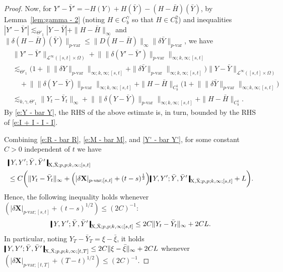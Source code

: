 \documentclass[11pt,reqno]{amsart}
\numberwithin{equation}{section}
\newcommand{\shortthickbar}{%
  \vcenter{\hbox{\rule{1.8pt}{2.2ex}}}%
}
\newcommand{\thicknm}[1]{%
  \mathopen{\shortthickbar}%
  \mkern4mu #1 \mkern4mu%
  \mathclose{\shortthickbar}%
}
\begin{document}
\begin{proof}
Now, for $Y' - \bar Y' = - H(Y) + H(\bar Y) - (H - \bar H)(\bar Y)$, by Lemma~\ref{lem:gamma - 2} (noting $H \in C^{\gamma}_b$ so that $H \in C^{2}_b$) and inequalities $|Y' - \bar Y'|\lesssim_{\Theta'_1} |Y - \bar Y| + \|H - \bar H\|_{\infty}$ and $\|\delta (H - \bar H)(\bar Y)\|_{p\text{-}\mathrm{var}} \le \|D(H - \bar H)\|_{\infty} \|\delta \bar Y\|_{p\text{-}\mathrm{var}}$, we have 
\begin{equation}\label{Y' - bar Y'}
\begin{aligned}
&\|Y' - \bar Y'\|_{\mathcal L^{\infty}([s,t] \times \Omega)} + \big\| \|\delta (Y' - \bar Y' )\|_{p\text{-}\mathrm{var}} \big\|_{\infty;k,\infty;[s,t]} \\ 
&\lesssim_{\Theta'_1} \Big(1 + \big\| \|\delta Y\|_{p\text{-}\mathrm{var}} \big\|_{\infty;k,\infty;[s,t]} + \|\delta \bar Y\|_{p\text{-}\mathrm{var}} \big\|_{\infty;k,\infty;[s,t]} \Big) \|Y - \bar Y\|_{\mathcal L^{\infty}([s,t] \times \Omega)}\\
&\quad + \big\| \|\delta (Y - \bar Y)\|_{p\text{-}\mathrm{var}} \big\|_{\infty;k,\infty;[s,t]} + \|H - \bar H\|_{C^1_b} \Big(1 + \big\| \|\delta \bar Y\|_{p\text{-}\mathrm{var}} \big\|_{\infty;k,\infty;[s,t]} \Big)\\
&\lesssim_{k,\gamma,\Theta'_1} \|Y_t - \bar Y_t\|_{\infty} + \big\| \|\delta (Y - \bar Y)\|_{p\text{-}\mathrm{var}} \big\|_{\infty;k,\infty;[s,t]} + \|H - \bar H\|_{C^{1}_{b}}. 
\end{aligned}
\end{equation}
By \eqref{e:Y - bar Y}, the RHS of the above estimate is, in turn, bounded by the RHS of \eqref{e:I + I - I - I}. 

Combining \eqref{e:R  - bar R}, \eqref{e:M - bar M}, and \eqref{Y' - bar Y'}, for some constant $C > 0$ independent of $t$ we have 
\begin{equation*}
\begin{aligned}
&\thicknm{Y ,Y'; \bar Y, \bar Y'}_{\mathrm X,\bar{\mathrm X};p,p;k,\infty;[s,t]} \\
&\le C \bigg( \|Y_t - \bar Y_t\|_{\infty} + \Big(|\delta \mathbf X|_{p\text{-}\mathrm{var};[s,t]} + (t - s)^{\frac{1}{2}}\Big) \thicknm{Y ,Y'; \bar Y, \bar Y'}_{\mathrm X,\bar{\mathrm X};p,p;k,\infty;[s,t]} + L \bigg). 
\end{aligned}
\end{equation*}
Hence, the following inequality holds whenever $(|\delta \mathbf X|_{p\text{-}\mathrm{var};[s,t]} + (t - s)^{1/2}) \le (2C)^{-1}$: 
\begin{equation*}
\thicknm{Y ,Y'; \bar Y, \bar Y'}_{\mathrm X,\bar{\mathrm X};p,p;k,\infty;[s,t]} \le 2C \|Y_t - \bar Y_t\|_{\infty} + 2 C L.  
\end{equation*}
In particular, noting $Y_T - \bar Y_T = \xi - \bar \xi$, it holds $\thicknm{Y ,Y'; \bar Y, \bar Y'}_{\mathrm X,\bar{\mathrm X};p,p;k,\infty;[t,T]} \le 2C \|\xi - \bar \xi\|_{\infty} + 2 C L$ whenever $(|\delta \mathbf X|_{p\text{-}\mathrm{var};[t,T]} + (T-t)^{1/2}) \le (2C)^{-1}$. 


\end{proof}
\end{document}
